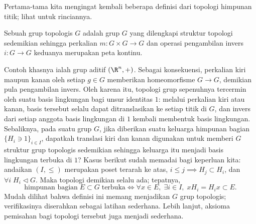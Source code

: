 Pertama-tama kita mengingat kembali beberapa definisi dari topologi himpunan titik; lihat \cite[Bab I]{FL14} untuk rinciannya.
\begin{definition}\label{def:topological-group}
	Sebuah grup topologis $G$ adalah grup $G$ yang dilengkapi struktur topologi sedemikian sehingga perkalian $m: G \times G \to G$ dan operasi pengambilan invers $i: G \to G$ keduanya merupakan peta kontinu.
\end{definition}
Contoh khasnya ialah grup aditif $(\R^n, +)$. Sebagai konsekuensi, perkalian kiri maupun kanan oleh setiap $g \in G$ memberikan homeomorfisme $G \to G$, demikian pula pengambilan invers. Oleh karena itu, topologi grup sepenuhnya tercermin oleh suatu basis lingkungan bagi unsur identitas $1$: melalui perkalian kiri atau kanan, basis tersebut selalu dapat ditranslasikan ke setiap titik di $G$, dan invers dari setiap anggota basis lingkungan di $1$ kembali membentuk basis lingkungan. Sebaliknya, pada suatu grup $G$, jika diberikan suatu keluarga himpunan bagian $\{H_i \ni 1\}_{i \in I}$, dapatkah translasi kiri dan kanan digunakan untuk memberi $G$ struktur grup topologis sedemikian sehingga keluarga itu menjadi basis lingkungan terbuka di $1$? Kasus berikut sudah memadai bagi keperluan kita: andaikan $(I, \leq)$ merupakan poset terarah ke atas, $i \leq j \implies H_j \subset H_i$, dan $\forall i \; H_i \lhd G$. Maka topologi demikian selalu ada; tepatnya,
\[ \text{himpunan bagian}\; E \subset G\; \text{terbuka} \iff \forall x \in E, \; \exists i \in I, \; xH_i = H_i x \subset E. \]
Mudah dilihat bahwa definisi ini memang menjadikan $G$ grup topologis; verifikasinya diserahkan sebagai latihan sederhana. Lebih lanjut, aksioma pemisahan bagi topologi tersebut juga menjadi sederhana.

